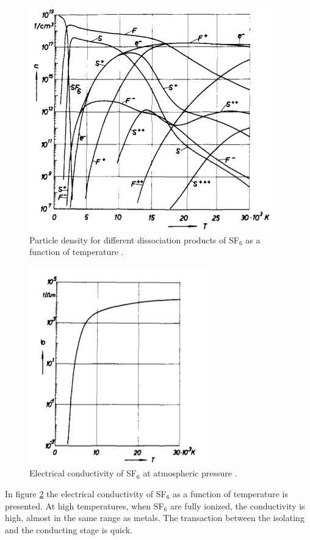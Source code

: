 \documentclass[10pt,a4paper]{article} %
\begin{document}
\begin{figure}[H]
\centering
\includegraphics[scale=0.5]{Bilder/Theory/particleDensSF6.png}
\caption{Particle density for different dissociation products of SF$_6$ as a function of temperature \cite{bib:IPSF6AQM}.} \label{fig:SF6densi}
\end{figure}

\begin{figure}[H]
\centering
\includegraphics[scale=0.5]{Bilder/Theory/SF6Conduct.png}
\caption{Electrical conductivity of SF$_6$ at atmospheric pressure \cite{bib:IPSF6AQM}.} \label{fig:condSF6}
\end{figure}

In figure \ref{fig:condSF6} the electrical conductivity of SF$_6$ as a function of temperature is presented. At high temperatures, when SF$_6$ are fully ionized, the conductivity is high, almost in the same range as metals. The transaction between the isolating and the conducting stage is quick. 
\end{document}

